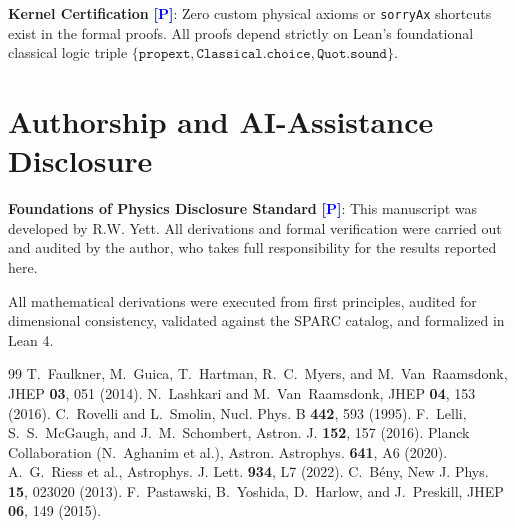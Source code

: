 \documentclass[aps,prd,twocolumn,superscriptaddress,nofootinbib,floatfix]{revtex4-2}
\newcommand{\tagP}{\textcolor{blue}{\textbf{[P]}}}
\theoremstyle{plain}
\theoremstyle{definition}
\begin{document}
\noindent \textbf{Kernel Certification} \tagP: Zero custom physical axioms or \texttt{sorryAx} shortcuts exist in the formal proofs. All proofs depend strictly on Lean's foundational classical logic triple $\{\texttt{propext}, \texttt{Classical.choice}, \texttt{Quot.sound}\}$.

\section{Authorship and AI-Assistance Disclosure}
\label{sec:disclosure}

\noindent \textbf{Foundations of Physics Disclosure Standard} \tagP:
This manuscript was developed by R.W. Yett. All derivations and formal verification were carried out and audited by the author, who takes full responsibility for the results reported here.

All mathematical derivations were executed from first principles, audited for dimensional consistency, validated against the SPARC catalog, and formalized in Lean 4.

\begin{thebibliography}{99}
 T.~Faulkner, M.~Guica, T.~Hartman, R.~C.~Myers, and M.~Van~Raamsdonk, JHEP \textbf{03}, 051 (2014).
 N.~Lashkari and M.~Van~Raamsdonk, JHEP \textbf{04}, 153 (2016).
 C.~Rovelli and L.~Smolin, Nucl. Phys. B \textbf{442}, 593 (1995).
 F.~Lelli, S.~S.~McGaugh, and J.~M.~Schombert, Astron. J. \textbf{152}, 157 (2016).
 Planck Collaboration (N.~Aghanim et al.), Astron. Astrophys. \textbf{641}, A6 (2020).
 A.~G.~Riess et al., Astrophys. J. Lett. \textbf{934}, L7 (2022).
 C.~B{\'e}ny, New J. Phys. \textbf{15}, 023020 (2013).
 F.~Pastawski, B.~Yoshida, D.~Harlow, and J.~Preskill, JHEP \textbf{06}, 149 (2015).
\end{thebibliography}
\end{document}
